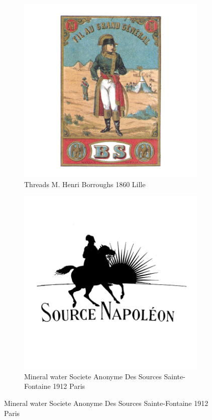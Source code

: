 \begin{figure}[h]
  \begin{subfigure}{.45\textwidth}
    \centering
    \includegraphics[width=.5\linewidth]{images/supplement/trademarks/french/6_21}
    \caption[]{Threads M. Henri Borroughs 1860 Lille}
    \label{fig:trademarks:french:6.21}
  \end{subfigure}\hfill
  \begin{subfigure}{.45\textwidth}
    \centering
    \includegraphics[width=.5\linewidth]{images/supplement/trademarks/french/6_24}
    \caption[]{Mineral water Societe Anonyme Des Sources Sainte-Fontaine 1912 Paris}
    \label{fig:trademarks:french:6.24}
  \end{subfigure}
\end{figure}

\clearpage

